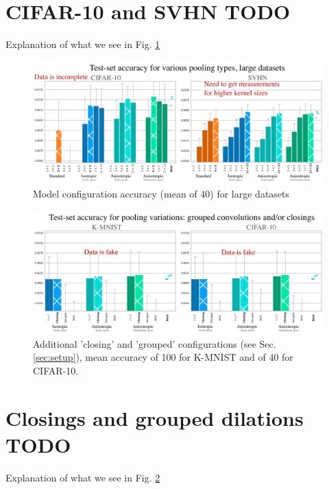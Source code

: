 \documentclass[a4paper, 12pt]{report}
\def\comment#1{\color{red}#1\color{black}}
\begin{document}
\vspace{-0.7cm}
\section{CIFAR-10 and SVHN  \comment{TODO}}
\comment{Explanation of what we see in Fig. \ref{fig:res-large}}


\begin{figure}[hb!]
	\center
  \includegraphics[width=1\textwidth]{figures/results-large.png}
  \caption{Model configuration accuracy (mean of 40) for large datasets  }
  \label{fig:res-large}
\end{figure}
\newpage
\begin{figure}[ht!]
	\center
  \includegraphics[width=1\textwidth]{figures/results-alt}
  \caption{Additional 'closing' and 'grouped' configurations (see Sec. \ref{sec:setup}), mean accuracy of 100 for K-MNIST and of 40 for CIFAR-10.}
  \label{fig:res-alt}
\end{figure}
\section{Closings and grouped dilations  \comment{TODO}}
\comment{Explanation of what we see in Fig. \ref{fig:res-alt}}
\end{document}
